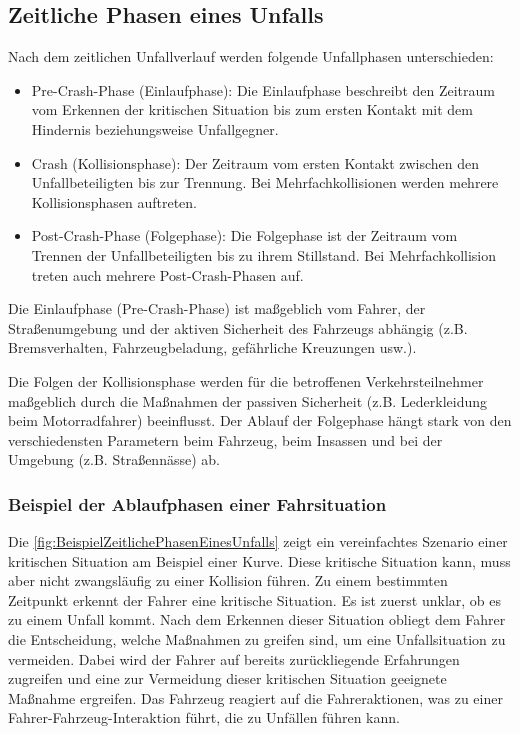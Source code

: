 %
\subsection{Zeitliche Phasen eines Unfalls}

Nach dem zeitlichen Unfallverlauf werden folgende Unfallphasen unterschieden:
\begin{itemize}
	\item Pre-Crash-Phase (Einlaufphase): 
	Die Einlaufphase beschreibt den Zeitraum vom Erkennen der kritischen Situation bis zum ersten Kontakt mit dem Hindernis beziehungsweise Unfallgegner.
	\item Crash (Kollisionsphase):
	Der Zeitraum vom ersten Kontakt zwischen den Unfallbeteiligten bis zur Trennung. Bei Mehrfachkollisionen werden mehrere Kollisionsphasen auftreten.
	\item Post-Crash-Phase (Folgephase):
	Die Folgephase ist der Zeitraum vom Trennen der Unfallbeteiligten bis zu ihrem Stillstand. Bei Mehrfachkollision treten auch mehrere Post-Crash-Phasen auf. 
	
\end{itemize}
Die Einlaufphase (Pre-Crash-Phase) ist maßgeblich vom Fahrer, der Straßenumgebung und der aktiven Sicherheit des Fahrzeugs abhängig (z.B. Bremsverhalten, Fahrzeugbeladung, gefährliche Kreuzungen usw.).
 
Die Folgen der Kollisionsphase werden für die betroffenen Verkehrsteilnehmer maßgeblich durch die Maßnahmen der passiven Sicherheit (z.B. Lederkleidung beim Motorradfahrer) beeinflusst. Der Ablauf der Folgephase hängt stark von den verschiedensten Parametern beim Fahrzeug, beim Insassen und bei der Umgebung (z.B. Straßennässe) ab.\citep{Appel2002}\\


\subsubsection{Beispiel der Ablaufphasen einer Fahrsituation}

Die \autoref{fig:BeispielZeitlichePhasenEinesUnfalls} zeigt ein vereinfachtes Szenario einer kritischen Situation am Beispiel einer Kurve. Diese kritische Situation kann, muss aber nicht zwangsläufig zu einer Kollision führen. Zu einem bestimmten Zeitpunkt erkennt der Fahrer eine kritische Situation. Es ist zuerst unklar, ob es zu einem Unfall kommt. Nach dem Erkennen dieser Situation obliegt dem Fahrer die Entscheidung, welche Maßnahmen zu greifen sind, um eine Unfallsituation zu vermeiden. Dabei wird der Fahrer auf bereits zurückliegende Erfahrungen zugreifen und eine zur Vermeidung dieser kritischen Situation geeignete Maßnahme ergreifen. Das Fahrzeug reagiert auf die Fahreraktionen, was zu einer \glqq Fahrer-Fahrzeug-Interaktion\grqq{} führt, die zu Unfällen führen kann.\citep{Appel2002}\\


